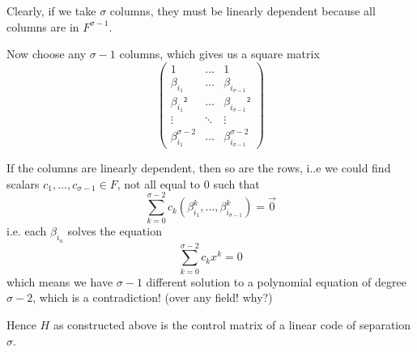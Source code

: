 \documentclass[english]{lbscript}
\begin{document}
Clearly, if we take \(𝜎\) columns, they must be linearly dependent because all columns are in \(F^{𝜎-1}\).

Now choose any \(𝜎-1\) columns, which gives us a square matrix
\begin{equation}
  \label{eq:155}
  \begin{pmatrix}
    1             & \dots  & 1                 \\
    𝛽_{i_1}       & \dots  & 𝛽_{i_{𝜎-1}}       \\
    𝛽_{i_1}²      & \dots  & 𝛽_{i_{𝜎-1}}²      \\
    \vdots        & \ddots & \vdots            \\
    𝛽_{i_1}^{𝜎-2} & \dots  & 𝛽_{i_{𝜎-1}}^{𝜎-2}
  \end{pmatrix}
\end{equation}

If the columns are linearly dependent, then so are the rows, i..e we could find scalars \(c_1, \dots, c_{𝜎-1}∈F\), not all equal to \(0\) such that
\begin{equation}
  \label{eq:156}
  ∑_{k=0}^{𝜎-2} c_k (𝛽_{i_1}^{k}, \dots, 𝛽_{i_{𝜎-1}}^{k}) = \vec{0}
\end{equation}
i.e. each \(𝛽_{i_{n}}\) solves the equation
\begin{equation}
  \label{eq:157}
  ∑_{k=0}^{𝜎-2} c_{k} x^{k} = 0
\end{equation}
which means we have \(𝜎-1\) different solution to a polynomial equation of degree \(𝜎-2\), which is a contradiction! (over any field! why?)

Hence \(H\) as constructed above is the control matrix of a linear code of separation \(𝜎\).
\end{document}
